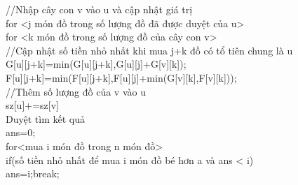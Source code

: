\documentclass[10pt,a4paper]{article}
\begin{document}
\begin{flushleft}
\hspace{2 cm} //Nhập cây con v vào u và cập nhật giá trị\\
\hspace{2 cm} for <j món đồ trong số lượng đồ đã được duyệt của u>\\
\hspace{3 cm} for <k món đồ trong số lượng đồ của cây con v> \\
\hspace{4 cm} //Cập nhật số tiền nhỏ nhất khi mua j+k đồ có tổ tiên chung là u\\
\hspace{4 cm} G[u][j+k]=min(G[u][j+k],G[u][j]+G[v][k]);\\
\hspace{4 cm} F[u][j+k]=min(F[u][j+k],F[u][j]+min(G[v][k],F[v][k]));\\
\hspace{3 cm} //Thêm số lượng đồ của v vào u\\
\hspace{3 cm} sz[u]+=sz[v]\\
\vspace{1cm}
Duyệt tìm kết quả\\
ans=0;\\
for<mua i món đồ trong n món đồ>\\
\hspace{1 cm} if(số tiền nhỏ nhất để mua i món đồ bé hơn a và ans < i)\\
\hspace{2 cm} ans=i;break;\\
\end{flushleft}
\end{document}
